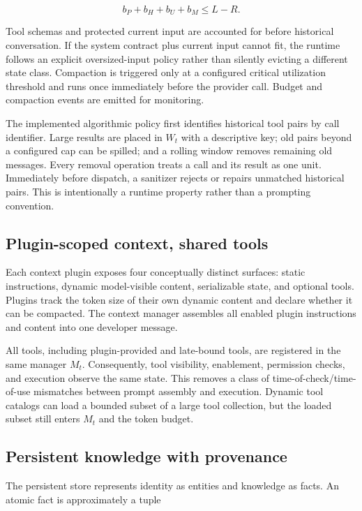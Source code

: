 \documentclass[sigplan,10pt,anonymous,review]{acmart}
\begin{document}
\begin{equation}
b_P + b_H + b_U + b_M \leq L - R.
\end{equation}

Tool schemas and protected current input are accounted for before historical
conversation.  If the system contract plus current input cannot fit, the
runtime follows an explicit oversized-input policy rather than silently
evicting a different state class.  Compaction is triggered only at a configured
critical utilization threshold and runs once immediately before the provider
call.  Budget and compaction events are emitted for monitoring.

The implemented algorithmic policy first identifies historical tool pairs by
call identifier.  Large results are placed in $W_t$ with a descriptive key;
old pairs beyond a configured cap can be spilled; and a rolling window removes
remaining old messages.  Every removal operation treats a call and its result
as one unit.  Immediately before dispatch, a sanitizer rejects or repairs
unmatched historical pairs.  This is intentionally a runtime property rather
than a prompting convention.

\subsection{Plugin-scoped context, shared tools}

Each context plugin exposes four conceptually distinct surfaces: static
instructions, dynamic model-visible content, serializable state, and optional
tools.  Plugins track the token size of their own dynamic content and declare
whether it can be compacted.  The context manager assembles all enabled plugin
instructions and content into one developer message.

All tools, including plugin-provided and late-bound tools, are registered in
the same manager $M_t$.  Consequently, tool visibility, enablement, permission
checks, and execution observe the same state.  This removes a class of
time-of-check/time-of-use mismatches between prompt assembly and execution.
Dynamic tool catalogs can load a bounded subset of a large tool collection,
but the loaded subset still enters $M_t$ and the token budget.

\subsection{Persistent knowledge with provenance}

The persistent store represents identity as entities and knowledge as facts.
An atomic fact is approximately a tuple
\end{document}
